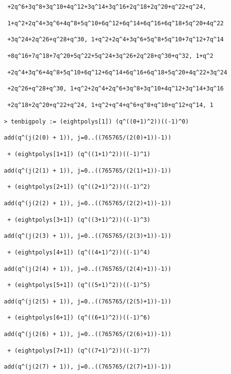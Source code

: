 \documentclass[12pt,reqno]{amsart}
\renewcommand{\(}{\left\(}
\renewcommand{\)}{\right\)}
\numberwithin{equation}{section}
\theoremstyle{plain}
\theoremstyle{definition}
\numberwithin{equation}{section}
\begin{document}
\verb! +2q^6+3q^8+3q^10+4q^12+3q^14+3q^16+2q^18+2q^20+q^22+q^24,!


\verb! 1+q^2+2q^4+3q^6+4q^8+5q^10+6q^12+6q^14+6q^16+6q^18+5q^20+4q^22 !

\verb! +3q^24+2q^26+q^28+q^30, 1+q^2+2q^4+3q^6+5q^8+5q^10+7q^12+7q^14 !
 
 \verb! +8q^16+7q^18+7q^20+5q^22+5q^24+3q^26+2q^28+q^30+q^32, 1+q^2 !
 
 
\verb! +2q^4+3q^6+4q^8+5q^10+6q^12+6q^14+6q^16+6q^18+5q^20+4q^22+3q^24!

\verb! +2q^26+q^28+q^30, 1+q^2+2q^4+2q^6+3q^8+3q^10+4q^12+3q^14+3q^16!
 

\verb! +2q^18+2q^20+q^22+q^24, 1+q^2+q^4+q^6+q^8+q^10+q^12+q^14, 1!


\verb!> tenbigpoly := (eightpolys[1]) (q^((0+1)^2))((-1)^0)!

\quad \quad \verb!add(q^(j(2(0) + 1)), j=0..((765765/(2(0)+1))-1))!

\verb! + (eightpolys[1+1]) (q^((1+1)^2))((-1)^1)!

\quad \quad \verb!add(q^(j(2(1) + 1)), j=0..((765765/(2(1)+1))-1))!

\verb! + (eightpolys[2+1]) (q^((2+1)^2))((-1)^2)!

\quad \quad \verb!add(q^(j(2(2) + 1)), j=0..((765765/(2(2)+1))-1))!

\verb! + (eightpolys[3+1]) (q^((3+1)^2))((-1)^3)!

\quad \quad \verb!add(q^(j(2(3) + 1)), j=0..((765765/(2(3)+1))-1))!

\verb! + (eightpolys[4+1]) (q^((4+1)^2))((-1)^4)!

\quad \quad \verb!add(q^(j(2(4) + 1)), j=0..((765765/(2(4)+1))-1))!

\verb! + (eightpolys[5+1]) (q^((5+1)^2))((-1)^5)!

\quad \quad \verb!add(q^(j(2(5) + 1)), j=0..((765765/(2(5)+1))-1))!

\verb! + (eightpolys[6+1]) (q^((6+1)^2))((-1)^6)!

\quad \quad \verb!add(q^(j(2(6) + 1)), j=0..((765765/(2(6)+1))-1))!

\verb! + (eightpolys[7+1]) (q^((7+1)^2))((-1)^7)!

\quad \quad \verb!add(q^(j(2(7) + 1)), j=0..((765765/(2(7)+1))-1))!
\end{document}
